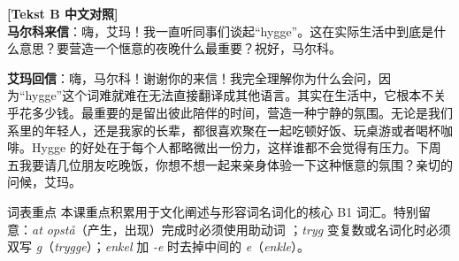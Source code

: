 \begin{transbox}
\small
\textbf{\color{NCDTeal}[Tekst B 中文对照]}\\
\textbf{马尔科来信}：嗨，艾玛！我一直听同事们谈起“hygge”。这在实际生活中到底是什么意思？要营造一个惬意的夜晚什么最重要？祝好，马尔科。

\textbf{艾玛回信}：嗨，马尔科！谢谢你的来信！我完全理解你为什么会问，因为“hygge”这个词难就难在无法直接翻译成其他语言。其实在生活中，它根本不关乎花多少钱。最重要的是留出彼此陪伴的时间，营造一种宁静的氛围。无论是我们系里的年轻人，还是我家的长辈，都很喜欢聚在一起吃顿好饭、玩桌游或者喝杯咖啡。Hygge 的好处在于每个人都略微出一份力，这样谁都不会觉得有压力。下周五我要请几位朋友吃晚饭，你想不想一起来亲身体验一下这种惬意的氛围？亲切的问候，艾玛。
\end{transbox}


\begin{tipbox}{词表重点}
本课重点积累用于文化阐述与形容词名词化的核心 B1 词汇。特别留意：\textit{at opstå}（产生，出现）完成时必须使用助动词 \dabold{[er]}；\textit{tryg} 变复数或名词化时必须双写 \textit{g}（\textit{trygge}）；\textit{enkel} 加 \textit{-e} 时去掉中间的 \textit{e}（\textit{enkle}）。
\end{tipbox}


